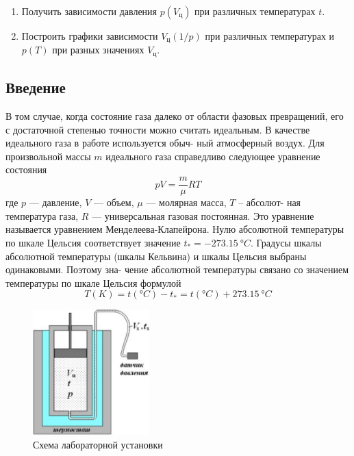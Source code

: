 \documentclass[12pt]{article}
\begin{document}
\begin{enumerate}
    \item Получить зависимости давления $p(V_{\text{ц}})$ при различных температурах $t$.
    \item Построить графики зависимости $V_{\text{ц}}(1/p)$ при различных температурах и $p(T)$ при разных значениях $V_{\text{ц}}$.
\end{enumerate}

\begin{center}
    \section*{Введение}
\end{center}

В том случае, когда состояние газа далеко от области фазовых
превращений, его с достаточной степенью точности можно считать
идеальным. В качестве идеального газа в работе используется обыч-
ный атмосферный воздух. Для произвольной массы $m$ идеального
газа справедливо следующее уравнение состояния
\begin{equation} \label{eq:mendeleev}
pV = \frac{m}{\mu} RT
\end{equation}
где $p$ — давление, $V$ — объем, $\mu$ — молярная масса, $T$ – абсолют-
ная температура газа, $R$ — универсальная газовая постоянная. Это
уравнение называется уравнением Менделеева-Клапейрона. Нулю
абсолютной температуры по шкале Цельсия соответствует значение
$t_{*} = \SI{-273.15}{\degree C}$. Градусы шкалы абсолютной температуры (шкалы %
Кельвина) и шкалы Цельсия выбраны одинаковыми. Поэтому зна-
чение абсолютной температуры связано со значением температуры
по шкале Цельсия формулой
\begin{equation} \label{eq:temp_conversion}
T(\si{K}) = t(\si{\degree C}) - t_{*} = t(\si{\degree C}) + \SI{273.15}{\degree C} %
\end{equation}

\vfill %

\newpage
\vspace{1em} %

\begin{figure}[H] %
  \centering
  \includegraphics[width=0.4\textwidth]{fig_1.png} %
  \caption{Схема лабораторной установки}
  \label{fig:schema}
\end{figure}
\end{document}

